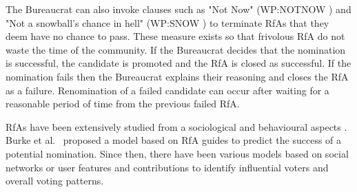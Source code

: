 The Bureaucrat can also invoke clauses such as "Not Now" (WP:NOTNOW \cite{wiki:wp:notnow}) and "Not a snowball's chance in hell" (WP:SNOW \cite{wiki:wp:snow}) to terminate RfAs that they deem have no chance to pass.
These measure exists so that frivolous RfA do not waste the time of the community.
If the Bureaucrat decides that the nomination is successful, the candidate is promoted and the RfA is closed as successful.
If the nomination fails then the Bureaucrat explains their reasoning and closes the RfA as a failure.
Renomination of a failed candidate can occur after waiting for a reasonable period of time from the previous failed RfA.

RfAs have been extensively studied from a sociological and behavioural aspects \cite{derthick2011collaborative,kordzadeh2016revisiting}.
Burke et al.\ \cite{burke2008mopping} proposed a model based on RfA guides to predict the success of a potential nomination.
Since then, there have been various models based on social networks  \cite{putzke2017stated,cabunducan2011voting,picot-clemente2015social} or user features and contributions \cite{clemente2015contribution,asim2018personal} to identify influential voters and overall voting patterns. 
